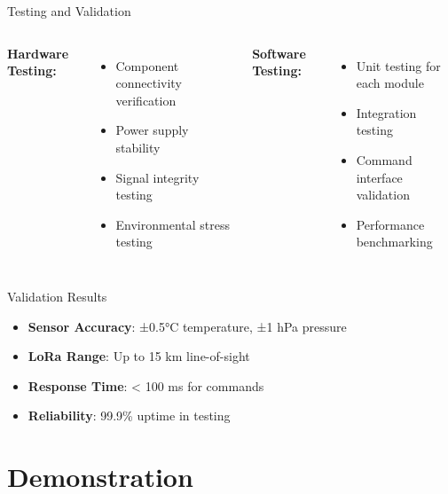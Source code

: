 \documentclass[aspectratio=169]{beamer}
\begin{document}
\begin{frame}{Testing and Validation}
\begin{columns}
\textbf{Hardware Testing:}
\begin{itemize}
    \item Component connectivity verification
    \item Power supply stability
    \item Signal integrity testing
    \item Environmental stress testing
\end{itemize}

\textbf{Software Testing:}
\begin{itemize}
    \item Unit testing for each module
    \item Integration testing
    \item Command interface validation
    \item Performance benchmarking
\end{itemize}
\end{columns}

\begin{block}{Validation Results}
\begin{itemize}
    \item \textbf{Sensor Accuracy}: ±0.5°C temperature, ±1 hPa pressure
    \item \textbf{LoRa Range}: Up to 15 km line-of-sight
    \item \textbf{Response Time}: < 100 ms for commands
    \item \textbf{Reliability}: 99.9\% uptime in testing
\end{itemize}
\end{block}
\end{frame}

\section{Demonstration}
\end{document}
